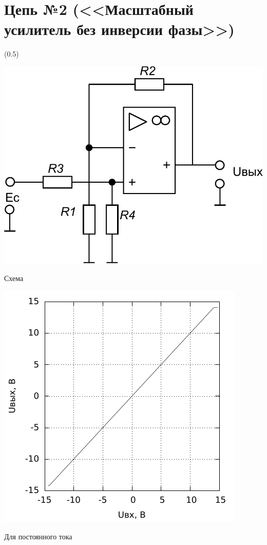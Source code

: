 \section{Цепь №2 (<<Масштабный усилитель без инверсии фазы>>)}

\sidefig(0.5\textwidth){
\includegraphics[scale=0.6]{Circ2.pdf}
\caption{Схема}
\includegraphics[scale=1.2]{4.pdf}
\caption{Для постоянного тока}}
